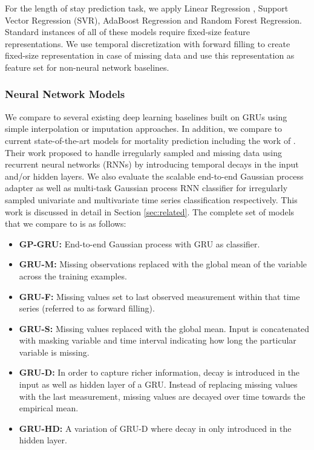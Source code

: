 \documentclass{article} \usepackage{iclr2019_conference,times}
\begin{document}
For the length of stay prediction task, we apply Linear Regression \citep{hastie01statisticallearning}, Support Vector Regression (SVR), AdaBoost Regression \citep{drucker} and Random Forest Regression. Standard instances of all of these models require fixed-size feature representations. We use temporal discretization with forward filling to create fixed-size representation in case of missing data and use this representation as feature set for non-neural network baselines. 


\subsubsection{Neural Network Models}
We compare to several existing deep learning baselines built on GRUs using simple interpolation or imputation approaches. In addition, we compare to current state-of-the-art models for mortality prediction including the work of \cite{che2016recurrent}. Their work proposed to handle irregularly sampled and missing data using recurrent neural networks (RNNs) by introducing temporal decays in the input and/or hidden layers.  We also evaluate the scalable end-to-end Gaussian process adapter  \citep{li2016scalable} as well as multi-task Gaussian process RNN classifier \citep{futoma2017improved} for
irregularly sampled univariate and multivariate time series classification respectively.  This work is discussed in detail in Section 
\ref{sec:related}. The complete set of models that we compare to is as follows:

\begin{itemize}
\item{\bf GP-GRU:} End-to-end Gaussian process with GRU as classifier.
\item {\bf GRU-M:} Missing observations replaced with the global mean of the variable across the training examples. 
\item {\bf GRU-F:} Missing values set to last observed measurement within that time series (referred to as forward filling). 
\item {\bf GRU-S:}  Missing values replaced with the global mean. Input is concatenated with masking variable
and time interval indicating how long the particular variable is missing. 
\item {\bf GRU-D:}  In order to capture richer information, decay is introduced in the input as well as hidden layer of a GRU. Instead of replacing missing values with the last measurement, missing values are decayed over time towards the empirical mean. 
\item{\bf GRU-HD:} A variation of GRU-D where decay in only introduced in the hidden layer.

\end{itemize}
\end{document}
